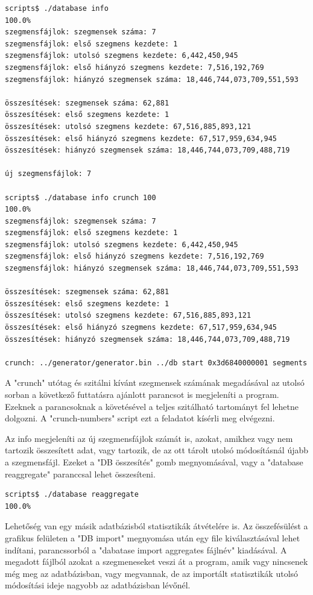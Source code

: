 \documentclass[12pt]{report}
\begin{document}
{\tiny
\begin{lstlisting}[language=bash]
scripts$ ./database info
100.0%
szegmensfájlok: szegmensek száma: 7
szegmensfájlok: első szegmens kezdete: 1
szegmensfájlok: utolsó szegmens kezdete: 6,442,450,945
szegmensfájlok: első hiányzó szegmens kezdete: 7,516,192,769
szegmensfájlok: hiányzó szegmensek száma: 18,446,744,073,709,551,593

összesítések: szegmensek száma: 62,881
összesítések: első szegmens kezdete: 1
összesítések: utolsó szegmens kezdete: 67,516,885,893,121
összesítések: első hiányzó szegmens kezdete: 67,517,959,634,945
összesítések: hiányzó szegmensek száma: 18,446,744,073,709,488,719

új szegmensfájlok: 7

scripts$ ./database info crunch 100
100.0%
szegmensfájlok: szegmensek száma: 7
szegmensfájlok: első szegmens kezdete: 1
szegmensfájlok: utolsó szegmens kezdete: 6,442,450,945
szegmensfájlok: első hiányzó szegmens kezdete: 7,516,192,769
szegmensfájlok: hiányzó szegmensek száma: 18,446,744,073,709,551,593

összesítések: szegmensek száma: 62,881
összesítések: első szegmens kezdete: 1
összesítések: utolsó szegmens kezdete: 67,516,885,893,121
összesítések: első hiányzó szegmens kezdete: 67,517,959,634,945
összesítések: hiányzó szegmensek száma: 18,446,744,073,709,488,719

crunch: ../generator/generator.bin ../db start 0x3d6840000001 segments 0x64
\end{lstlisting}
}

A "crunch" utótag és szitálni kívánt szegmensek számának megadásával az utolsó sorban
a következő futtatásra ajánlott parancsot is megjeleníti a program.
Ezeknek a parancsoknak a követésével a teljes szitálható tartományt fel lehetne dolgozni.
A "crunch-numbers" script ezt a feladatot kísérli meg elvégezni.

Az info megjeleníti az új szegmensfájlok számát is, azokat,
amikhez vagy nem tartozik összesített adat, vagy tartozik,
de az ott tárolt utolsó módosításnál újabb a szegmensfájl.
Ezeket a "DB összesítés" gomb megnyomásával,
vagy a "database reaggregate" paranccsal lehet összesíteni.

{\tiny
\begin{lstlisting}[language=bash]
scripts$ ./database reaggregate
100.0%
\end{lstlisting}
}

Lehetőség van egy másik adatbázisból statisztikák átvételére is.
Az összefésülést a grafikus felületen a "DB import" megnyomása után
egy file kiválasztásával lehet indítani, parancssorból a "dabatase import aggregates fájlnév"
kiadásával. A megadott fájlból azokat a szegmeneseket veszi át a program,
amik vagy nincsenek még meg az adatbázisban, vagy megvannak, de az importált
statisztikák utolsó módosítási ideje nagyobb az adatbázisban lévőnél.
\end{document}
